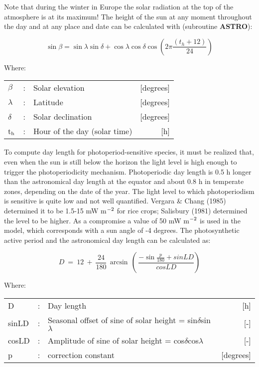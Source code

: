 Note that during the winter in Europe the solar radiation at the top of the atmo\-sphere is at 
its maximum! The height of the sun at any moment throughout the day and at any place and date can be
calculated with (subroutine {\bf ASTRO}):

\begin{equation}
\label{eq:SolarElevation}
\sin \beta = \sin \lambda \sin \delta + \cos \lambda \cos \delta \cos (2 \pi {\frac{(t _{h} +12)}{24}} )
\end{equation}

Where:\\[5pt]
\begin{tabularx}{\textwidth}{llXr}
$\beta$ &:& Solar elevation  & [degrees]\\
$\lambda$ &:& Latitude  & [degrees]\\
$\delta$ &:& Solar declination  & [degrees]\\
t$_{{\rm h}}$ &:& Hour of the day (solar time)  & [h]\\
\end{tabularx}

To compute day length for photoperiod-sensitive species, it must be realized that, even
when the sun is still below the horizon the light level is high enough to trigger the
photoperiodicity mechan\-ism. Photoperiodic day length is 0.5 h longer than the 
astronomi\-cal day length at the equator and about 0.8 h in temperate zones, depending 
on the date of the year. The light level to which photoperiodism is sensitive is quite low and not well
quantified. Vergara \& Chang (1985) determined it to be 1.5-15 mW m$^{{\rm -2}}$ for 
rice crops; Salisbury (1981) determined the level to be higher. As a compromise a value of 50 mW
m$^{{\rm -2}}$ is used in the model, which corresponds with a sun angle of -4 degrees. The
photosynthetic active period and the astro\-nomical day length can be calculated as:

\begin{equation}
\label{eq:AstroDaylength}
D ~=~ 12~+~{\frac{24}{180}} \, \arcsin \, (\,{\frac{-\sin {\frac{p}{180}} + sinLD}{cosLD}} )
\end{equation}

Where:\\[5pt]
\begin{tabularx}{\textwidth}{llXr}
D &:& Day length  & [h]\\
sinLD &:& Seasonal offset of sine of solar height = sin$\delta$sin$\lambda$  & [-]\\
cosLD &:& Amplitude of sine of solar height = cos$\delta$cos$\lambda$  & [-]\\
p &:& correction constant  & [degrees]\\
\end{tabularx}

